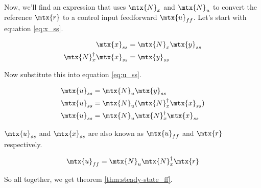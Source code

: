 Now, we'll find an expression that uses $\mtx{N}_x$ and $\mtx{N}_u$ to convert
the \gls{reference} $\mtx{r}$ to a \gls{control input} feedforward
$\mtx{u}_{ff}$. Let's start with equation \eqref{eq:x_ss}.

\begin{align*}
  \mtx{x}_{ss} &= \mtx{N}_x \mtx{y}_{ss} \\
  \mtx{N}_x^\dagger \mtx{x}_{ss} &= \mtx{y}_{ss}
\end{align*}

Now substitute this into equation \eqref{eq:u_ss}.

\begin{align*}
  \mtx{u}_{ss} &= \mtx{N}_u \mtx{y}_{ss} \\
  \mtx{u}_{ss} &= \mtx{N}_u (\mtx{N}_x^\dagger \mtx{x}_{ss}) \\
  \mtx{u}_{ss} &= \mtx{N}_u \mtx{N}_x^\dagger \mtx{x}_{ss}
\end{align*}

$\mtx{u}_{ss}$ and $\mtx{x}_{ss}$ are also known as $\mtx{u}_{ff}$ and $\mtx{r}$
respectively.

\begin{align*}
  \mtx{u}_{ff} = \mtx{N}_u \mtx{N}_x^\dagger \mtx{r}
\end{align*}

So all together, we get theorem \ref{thm:steady-state_ff}.

